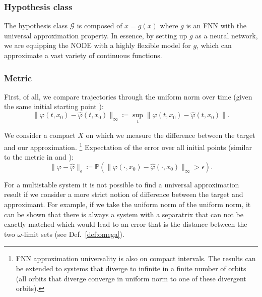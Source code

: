 \documentclass{article}
\theoremstyle{definition} \newtheorem{definition}{Definition}
\theoremstyle{remark} \newtheorem{remark}{Remark}
\newcommand{\vol}{\operatorname{vol}}
\newcounter{ct}
\begin{document}
\subsubsection{Hypothesis class}\label{sec:hypothesis}
The hypothesis class $\mathcal{G}$ is composed of $\dot x = g(x)$
where $g$ is an FNN with the universal approximation property. %
In essence, by setting up $g$ as a neural network, we are equipping the NODE with a highly flexible model for $g$, which can approximate a vast variety of continuous functions. 


\subsubsection{Metric}\label{sec:metric}
First, of all, we compare trajectories through the uniform norm over time (given the same initial starting point \citep{girard2007approximation}):
\begin{equation}
\|\varphi(t,x_0)-\hat \varphi(t,x_0)\|_\infty \coloneqq \sup_t\|\varphi(t,x_0)-\hat \varphi(t,x_0)\|.
\end{equation}

We consider a compact $X$ on which we measure the difference between the target and our approximation.
\footnote{FNN approximation universality is also on compact intervals.
The results can be extended to systems that diverge to infinite in a finite number of orbits (all orbits that diverge converge in uniform norm to one of these divergent orbits).}
%
Expectation of the error over all initial points (similar to the metric in \citep{hammer2000approximation} and \citep{hanson2021learning}):
\begin{equation}\label{eq:initerror}
\|\varphi-\hat \varphi\|_\epsilon \coloneqq  \mathbb{P}\left(\|\varphi(\cdot,x_0)-\hat \varphi(\cdot,x_0)\|_\infty>\epsilon\right).
\end{equation}


For a multistable system it is not possible to find a universal approximation result if we consider a more strict notion of difference between the target and approximant.
For example, if we take the uniform norm of the uniform norm, it can be shown that there is always a system with a separatrix that can not be exactly matched which would lead to an error that is the distance between the two $\omega$-limit sets (see Def.~\ref{def:omega}).
\end{document}
